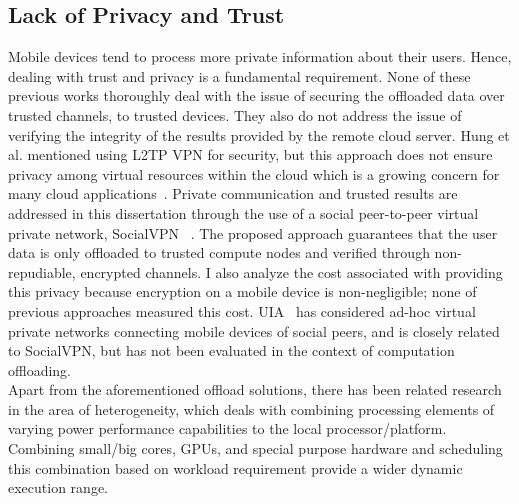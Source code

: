 \subsection{Lack of Privacy and Trust}
\label{intro:lack}
%
Mobile devices tend to process more private information about their
users.
%
Hence, dealing with trust and privacy is a fundamental requirement.
%
None of these previous works thoroughly deal with the issue of securing
the offloaded data over trusted channels, to trusted devices.
%
They also do not address the issue of verifying the integrity of the
results provided by the remote cloud server.
%
Hung et al. mentioned using L2TP VPN for security, but this approach
does not ensure privacy among virtual resources within the cloud which
is a growing concern for many cloud applications~\cite{brodkin}.
%
Private communication and trusted results are addressed in this
dissertation through the use of a social peer-to-peer virtual
private network, SocialVPN~\cite{socialvpn} . 
%
The proposed approach guarantees that the user data is only offloaded to
trusted compute nodes and verified through non-repudiable, encrypted
channels.
%
I also analyze the cost associated with providing this privacy because
encryption on a mobile device is non-negligible; none of previous
approaches measured this cost.
%
UIA~\cite{uia} has considered ad-hoc virtual private networks connecting
mobile devices of social peers, and is closely related to SocialVPN, but
has not been evaluated in the context of computation offloading.\\
%
Apart from the aforementioned offload solutions, there has been related
research in the area of heterogeneity, which deals with
combining processing elements of varying power performance capabilities
to the local processor/platform.
%
Combining small/big cores, GPUs, and special purpose hardware and
scheduling this combination based on workload requirement provide a
wider dynamic execution range.
%

